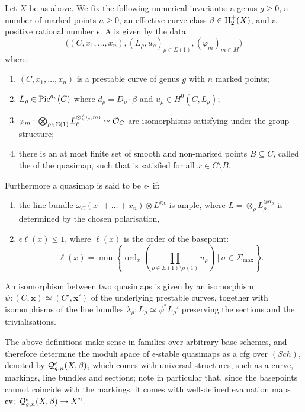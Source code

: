 \begin{definition}\cite[Definition 3.1.1]{CF-K} Let $X$ be as above. We fix the following numerical invariants: a genus $g \geq 0$, a number of marked points $n \geq 0$, an effective curve class $\beta \in \operatorname{H}_2^+(X)$, and a positive rational number $\epsilon$. A  is given by the data
\begin{equation*} \Big((C,x_1,\ldots,x_n), (L_\rho,u_\rho)_{\rho \in \Sigma(1)}, (\varphi_m)_{m \in M}\Big) \end{equation*}
where:
\begin{enumerate}
\item $(C,x_1,\ldots,x_n)$ is a prestable curve of genus $g$ with $n$ marked points;
\item $L_\rho\in\operatorname{Pic}^{d_\rho}(C)$  where $d_\rho = D_\rho \cdot \beta$ and $u_\rho\in H^0(C,L_\rho)$;
\item $\varphi_m \colon \bigotimes_{\rho \in \Sigma(1)} L_\rho^{\otimes \langle v_\rho, m \rangle} \simeq \mathcal{O}_C$ are isomorphisms satisfying  under the group structure;
\item there is an at most finite set of smooth and non-marked points $B \subseteq C$, called the  of the quasimap, such that  is satisfied for all $x \in C \setminus B$.
\end{enumerate}
Furthermore a quasimap is said to be $\epsilon$- if:
\begin{enumerate}[resume]
 \item the line bundle $ \omega_C(x_1 + \ldots + x_n)\otimes L^{\otimes \epsilon}$ is ample, where $L = \otimes_\rho L_\rho^{\otimes \alpha_\rho}$ is determined by the chosen polarisation,
 \item $\epsilon \ell(x)\leq 1$, where $\ell(x)$ is the order of the basepoint:
\[\ell(x)=\min\left\{\operatorname{ord}_x\left(\prod_{\rho\in\Sigma(1)\setminus \sigma(1)}u_\rho\right)\ |\ \sigma\in\Sigma_{\operatorname{max}}\right\}.\]
\end{enumerate}
An isomorphism between two quasimaps is given by an isomorphism $\psi\colon (C,\mathbf x)\simeq(C',\mathbf x')$ of the underlying prestable curves, together with isomorphisms of the line bundles $\lambda_\rho\colon L_\rho\simeq \psi^* L_\rho'$ preserving the sections and the trivialisations.
\end{definition}

The above definitions make sense in families over arbitrary base schemes, and therefore determine the moduli space of $\epsilon$-stable quasimaps as a cfg over $(Sch)$, denoted by $\mathcal{Q}^{\epsilon}_{g,n}(X,\beta)$, which comes with universal structures, such as a curve, markings, line bundles and sections; note in particular that, since the basepoints cannot coincide with the markings, it comes with well-defined evaluation maps $\operatorname{ev}\colon \mathcal{Q}^{\epsilon}_{g,n}(X,\beta)\rightarrow X^n$.

